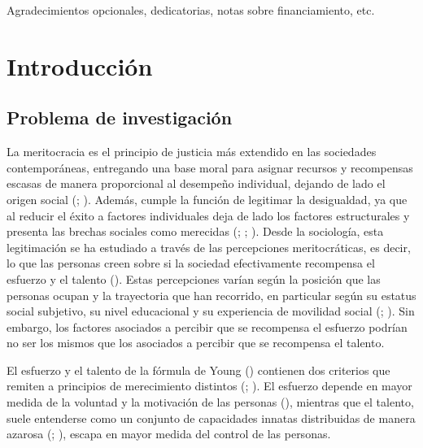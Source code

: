 \documentclass[
  spanish,
  a4paper,
  oneside]{scrbook}
\begin{document}

Agradecimientos opcionales, dedicatorias, notas sobre financiamiento,
etc.

\mainmatter


\chapter{Introducción}\label{introducciuxf3n}

\section{Problema de
investigación}\label{problema-de-investigaciuxf3n-1}

La meritocracia es el principio de justicia más extendido en las
sociedades contemporáneas, entregando una base moral para asignar
recursos y recompensas escasas de manera proporcional al desempeño
individual, dejando de lado el origen social
(;
). Además,
cumple la función de legitimar la desigualdad, ya que al reducir el
éxito a factores individuales deja de lado los factores estructurales y
presenta las brechas sociales como merecidas
(;
;
). Desde
la sociología, esta legitimación se ha estudiado a través de las
percepciones meritocráticas, es decir, lo que las personas creen sobre
si la sociedad efectivamente recompensa el esfuerzo y el talento
().
Estas percepciones varían según la posición que las personas ocupan y la
trayectoria que han recorrido, en particular según su estatus social
subjetivo, su nivel educacional y su experiencia de movilidad social
(; ). Sin embargo,
los factores asociados a percibir que se recompensa el esfuerzo podrían
no ser los mismos que los asociados a percibir que se recompensa el
talento.

El esfuerzo y el talento de la fórmula de Young
() contienen dos criterios que remiten a
principios de merecimiento distintos
(;
). El esfuerzo depende en
mayor medida de la voluntad y la motivación de las personas
(),
mientras que el talento, suele entenderse como un conjunto de
capacidades innatas distribuidas de manera azarosa
(;
), escapa
en mayor medida del control de las personas.
\end{document}
